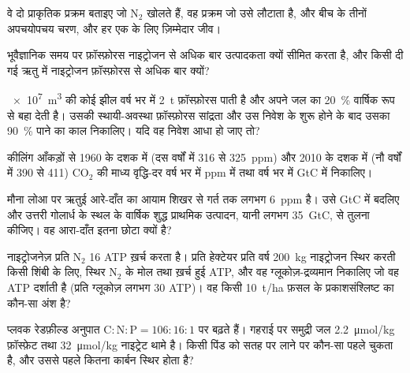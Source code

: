 \begin{exercise}[$\star$]\label{exo:b2:biogeochemical-cycles:3}
वे दो प्राकृतिक प्रक्रम बताइए जो $\mathrm{N_2}$ खोलते हैं, वह प्रक्रम जो उसे
लौटाता है, और बीच के तीनों अपचयोपचय चरण, और हर एक के लिए
ज़िम्मेदार जीव।
\end{exercise}

\begin{exercise}[$\star$]\label{exo:b2:biogeochemical-cycles:4}
भूवैज्ञानिक समय पर फ़ॉस्फ़ोरस नाइट्रोजन से अधिक बार उत्पादकता क्यों
सीमित करता है, और किसी दी गई ऋतु में नाइट्रोजन फ़ॉस्फ़ोरस से अधिक बार
क्यों?
\end{exercise}

\begin{exercise}[$\star\star$]\label{exo:b2:biogeochemical-cycles:5}
\qty{e7}{m^3} की कोई झील वर्ष भर में \qty{2}{t} फ़ॉस्फ़ोरस पाती है
और अपने जल का \qty{20}{\%} वार्षिक रूप से बहा देती है। उसकी स्थायी-अवस्था
फ़ॉस्फ़ोरस सांद्रता और उस निवेश के शुरू होने के बाद उसका \qty{90}{\%}
पाने का काल निकालिए। यदि वह निवेश आधा हो जाए तो?
\end{exercise}

\begin{exercise}[$\star\star$]\label{exo:b2:biogeochemical-cycles:6}
कीलिंग आँकड़ों से 1960 के दशक में (दस वर्षों में 316 से \qty{325}{ppm})
और 2010 के दशक में (नौ वर्षों में 390 से 411) $\mathrm{CO_2}$ की
माध्य वृद्धि-दर वर्ष भर में ppm में तथा वर्ष भर में GtC में निकालिए।
\end{exercise}

\begin{exercise}[$\star\star$]\label{exo:b2:biogeochemical-cycles:7}
मौना लोआ पर ऋतुई आरे-दाँत का आयाम शिखर से गर्त तक लगभग
\qty{6}{ppm} है। उसे GtC में बदलिए और उत्तरी गोलार्ध के स्थल के
वार्षिक शुद्ध प्राथमिक उत्पादन, यानी लगभग \qty{35}{GtC}, से तुलना कीजिए। वह आरा-दाँत इतना छोटा क्यों है?
\end{exercise}

\begin{exercise}[$\star\star$]\label{exo:b2:biogeochemical-cycles:8}
नाइट्रोजनेज़ प्रति $\mathrm{N_2}$ 16 ATP ख़र्च करता है। प्रति हेक्टेयर प्रति वर्ष
\qty{200}{kg} नाइट्रोजन स्थिर करती किसी शिंबी के लिए, स्थिर
$\mathrm{N_2}$ के मोल तथा ख़र्च हुई ATP, और वह ग्लूकोज़-द्रव्यमान निकालिए जो वह ATP
दर्शाती है (प्रति ग्लूकोज़ लगभग 30 ATP)। वह किसी
\qty{10}{t/ha} फ़सल के प्रकाशसंश्लिष्ट का कौन-सा अंश है?
\end{exercise}

\begin{exercise}[$\star\star$]\label{exo:b2:biogeochemical-cycles:9}
प्लवक रेडफ़ील्ड अनुपात $\mathrm{C:N:P} = 106:16:1$ पर बढ़ते हैं।
गहराई पर समुद्री जल \qty{2.2}{\micro mol/kg} फ़ॉस्फ़ेट तथा
\qty{32}{\micro mol/kg} नाइट्रेट थामे है। किसी पिंड को सतह पर लाने पर
कौन-सा पहले चुकता है, और उससे पहले कितना कार्बन स्थिर
होता है?
\end{exercise}

